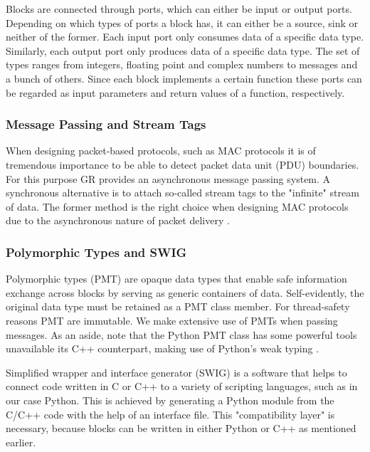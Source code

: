 Blocks are connected through ports, which can either be input or output ports. Depending on which types of ports a block has, it can either be a source, sink or neither of the former. 
Each input port only consumes data of a specific data type. Similarly, each output port only produces data of a specific data type. The set of types ranges from integers, floating point and complex numbers to messages and a bunch of others. Since each block implements a certain function these ports can be regarded as input parameters and return values of a function, respectively.

\subsubsection{Message Passing and Stream Tags}

When designing packet-based protocols, such as MAC protocols it is of tremendous importance to be able to detect packet data unit (PDU) boundaries. For this purpose GR provides an asynchronous message passing system. A synchronous alternative is to attach so-called stream tags to the "infinite" stream of data. The former method is the right choice when designing MAC protocols due to the asynchronous nature of packet delivery \cite{GR1}\cite{GRDocs}.  

\subsubsection{Polymorphic Types and SWIG} 

Polymorphic types (PMT) are opaque data types that enable safe information exchange across blocks by serving as generic containers of data. Self-evidently, the original data type must be retained as a PMT class member. For thread-safety reasons PMT are immutable. We make extensive use of PMTs when passing messages. As an aside, note that the Python PMT class has some powerful tools unavailable its C++ counterpart, making use of Python's weak typing \cite{GRDocs}.

Simplified wrapper and interface generator (SWIG) is a software that helps to connect code written in C or C++ to a variety of scripting languages, such as in our case Python. This is achieved by generating a Python module from the C/C++ code with the help of an interface file. This "compatibility layer" is necessary, because blocks can be written in either Python or C++ as mentioned earlier.